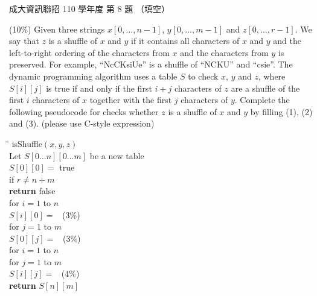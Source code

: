\begin{pastexam}[label={px:ncku-110-prog-08}]{成大資訊聯招 110 學年度 第 8 題}
（填空）

(10\%) Given three strings $x[0,\ldots,n-1]$, $y[0,\ldots,m-1]$ and $z[0,\ldots,r-1]$. We say
that $z$ is a shuffle of $x$ and $y$ if it contains all characters of $x$ and $y$ and the
left-to-right ordering of the characters from $x$ and the characters from $y$ is preserved. For
example, ``NcCKsiUe'' is a shuffle of ``NCKU'' and ``csie''. The dynamic programming algorithm
uses a table $S$ to check $x$, $y$ and $z$, where $S[i][j]$ is true if and only if the first $i+j$
characters of $z$ are a shuffle of the first $i$ characters of $x$ together with the first $j$
characters of $y$. Complete the following pseudocode for checks whether $z$ is a shuffle of $x$
and $y$ by filling (1), (2) and (3). (please use C-style expression)

\begin{tabbing}
\quad\=\quad\=\quad\=\quad\=\kill
isShuffle$(x,y,z)$\\
\>Let $S[0\ldots n][0\ldots m]$ be a new table\\
\>$S[0][0]=$ true\\
\>if $r\neq n+m$\\
\>\>\textbf{return} false\\
\>for $i=1$ to $n$\\
\>\>$S[i][0]=$ ~(3\%)\\
\>for $j=1$ to $m$\\
\>\>$S[0][j]=$ ~(3\%)\\
\>for $i=1$ to $n$\\
\>\>for $j=1$ to $m$\\
\>\>\>$S[i][j]=$ ~(4\%)\\
\>\textbf{return} $S[n][m]$
\end{tabbing}
\end{pastexam}

